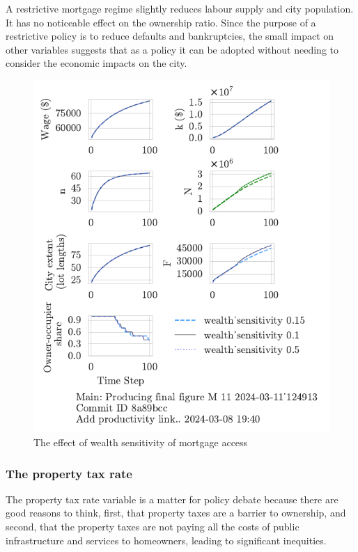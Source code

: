 A restrictive mortgage regime slightly reduces labour supply and city population. It has no noticeable effect on the ownership ratio. Since the purpose of a restrictive policy is to reduce defaults and bankruptcies, the small impact on other variables suggests that as a policy it can be adopted without needing to consider the economic impacts on the city. 

\begin{figure}[h!bt]
    \centering
    \includegraphics[scale=.8, trim={0 1.4cm 0 0},clip]{fig/wealth_sensitivity-124913.pdf}
    \caption{The effect of wealth sensitivity of mortgage access}
    \label{fig:wealth_sensitivity_ownership_trajectory}
\end{figure}

\newpage

\subsubsection{The property tax rate}

The property tax rate variable is a matter for policy debate because there are good reasons to think, first, that property taxes are a barrier to ownership, and second, that the property taxes are not paying all the costs of public infrastructure and services to homeowners, leading to significant inequities.

